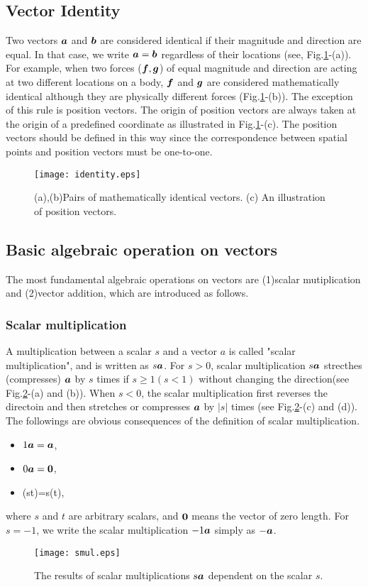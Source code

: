 \documentclass[10pt,a4j]{article}
\begin{document}
\subsection{Vector Identity}
Two vectors $\mbox{\boldmath $a$}$ and $\mbox{\boldmath $b$}$ are considered identical 
if their magnitude and direction are equal. In that case, we write $\mbox{\boldmath $a$}=\mbox{\boldmath $b$}$ regardless of their locations (see, Fig.\ref{fig:fig2}-(a)). For example, when two forces ($\mbox{\boldmath $f$}, \mbox{\boldmath $g$}$) of equal magnitude and direction are acting at two different locations on a body, $\mbox{\boldmath $f$}$ and $\mbox{\boldmath $g$}$ are considered mathematically identical although they are physically different forces (Fig.\ref{fig:fig2}-(b)). The exception of this rule is position vectors. The origin of position vectors are always taken at the origin of a predefined coordinate as illustrated in Fig.\ref{fig:fig2}-(c). The position vectors should be defined in this way since the correspondence between spatial points and position vectors must be one-to-one. 
\begin{figure}[h]
    \begin{center}
    \texttt{[image: identity.eps]} 
    \end{center}
    \caption{(a),(b)Pairs of mathematically identical vectors. 
    (c) An illustration of position vectors.} 
    \label{fig:fig2}
\end{figure}
\subsection{Basic algebraic operation on vectors}
The most fundamental algebraic operations on vectors are (1)scalar mutiplication and (2)vector addition, which are introduced as follows.
\subsubsection{Scalar multiplication}
A multiplication between a scalar $s$ and a vector $a$ is called "scalar multiplication", and is written as $s\mbox{\boldmath $a$}$. For $s>0$, scalar multiplication $s\mbox{\boldmath $a$}$ strecthes (compresses) $\mbox{\boldmath $a$}$ 
by $s$ times if $s \geq 1 (s<1)$ without changing the direction(see Fig.\ref{fig:fig3}-(a) and (b)).
When $s<0$, the scalar multiplication first reverses the directoin and then stretches or compresses 
$\mbox{\boldmath $a$}$ by $|s|$ times (see Fig.\ref{fig:fig3}-(c) and (d)).
The followings are obvious consequences of the definition of scalar multiplication. 
\begin{itemize}
\item 
    $1\mbox{\boldmath $a$}=\mbox{\boldmath $a$}$,
\item 
    $0\mbox{\boldmath $a$}=\mbox{\boldmath $0$}$,
\item
    (st)=s(t),
\end{itemize}
where $s$ and $t$ are arbitrary scalars, and $\mbox{\boldmath $0$}$ means the vector of zero length.
For $s=-1$, we write the scalar multiplication $-1\mbox{\boldmath $a$}$ simply as $-\mbox{\boldmath $a$}$.
\begin{figure}[h]
    \begin{center}
    \texttt{[image: smul.eps]} 
    \end{center}
    \caption{The results of scalar multiplications $s\mbox{\boldmath $a$}$ dependent on the scalar $s$.} 
    \label{fig:fig3}
\end{figure}
\end{document}
